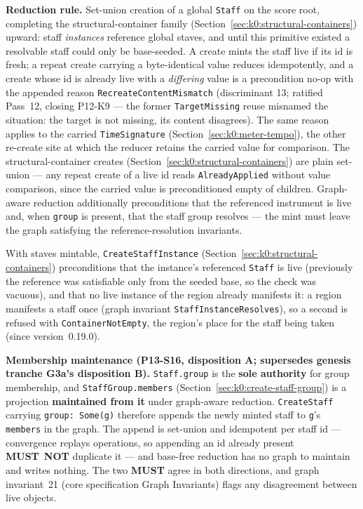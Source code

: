 \documentclass[11pt,letterpaper]{report}
\newcommand{\sectionsc}[1]{{\addfontfeatures{Letters=SmallCaps}#1}}
\newcommand{\MUST}{\textbf{MUST}}
\newcommand{\MUSTNOT}{\textbf{MUST}\nobreak\ \textbf{NOT}}
\begin{document}
\textbf{Reduction rule.} Set-union creation of a global \texttt{Staff} on the
score root, completing the structural-container family
(Section~\ref{sec:k0:structural-containers}) upward: staff \emph{instances}
reference global staves, and until this primitive existed a resolvable staff
could only be base-seeded. A create mints the staff live if its id is fresh; a
repeat create carrying a byte-identical value reduces idempotently, and a
create whose id is already live with a \emph{differing} value is a
precondition no-op with the appended reason
\texttt{RecreateContentMismatch} (discriminant 13; ratified Pass~12, closing
P12-K9 --- the former \texttt{TargetMissing} reuse misnamed the situation:
the target is not missing, its content disagrees). The same reason applies
to the carried \texttt{TimeSignature} (Section~\ref{sec:k0:meter-tempo}),
the other re-create site at which the reducer retains the carried value for
comparison. The structural-container creates
(Section~\ref{sec:k0:structural-containers}) are plain set-union --- any
repeat create of a live id reads \texttt{AlreadyApplied} without value
comparison, since the carried value is preconditioned empty of children. Graph-aware reduction additionally preconditions that the
referenced instrument is live and, when \texttt{group} is present, that the
staff group resolves --- the mint must leave the graph satisfying the
reference-resolution invariants.

With staves mintable, \texttt{CreateStaffInstance}
(Section~\ref{sec:k0:structural-containers}) preconditions that the
instance's referenced \texttt{Staff} is live (previously the reference was
satisfiable only from the seeded base, so the check was vacuous), and that no
live instance of the region already manifests it: a region manifests a staff
once (graph invariant \texttt{StaffInstanceResolves}), so a second is refused
with \texttt{ContainerNotEmpty}, the region's place for the staff being taken
(since version~0.19.0).

\textbf{Membership maintenance (P13-S16, disposition A; supersedes genesis
tranche G3a's disposition B).} \texttt{Staff.group} is the \textbf{sole
authority} for group membership, and \texttt{StaffGroup.members}
(Section~\ref{sec:k0:create-staff-group}) is a projection \textbf{maintained
from it} under graph-aware reduction. \texttt{CreateStaff} carrying
\texttt{group: Some(g)} therefore appends the newly minted staff to \texttt{g}'s
\texttt{members} in the graph. The append is set-union and idempotent per staff
id --- convergence replays operations, so appending an id already present
\MUSTNOT{} duplicate it --- and base-free reduction has no graph to maintain and
writes nothing. The two \MUST{} agree in both directions, and graph
invariant~21 (core specification \sectionsc{Graph Invariants}) flags any
disagreement between live objects.
\end{document}
